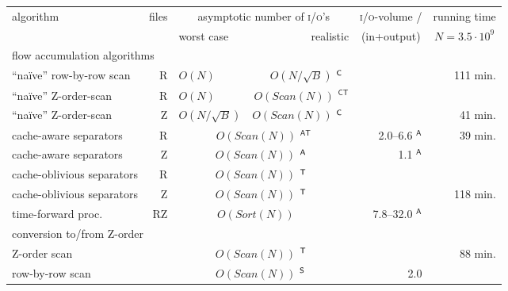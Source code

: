 \documentclass[10pt,a4paper]{article}
\def\io{\textsc{i/o}\xspace}
\def\ios{\textsc{i/o}'s\xspace}
\def\sort{\mathit{Sort}}
\def\scan{\mathit{Scan}}
\begin{document}
\begin{table}
\def\arraystretch{1.25}
\begin{tabularx}{\hsize}{|Xr|lr|r|r|}
\hline
algorithm & files & \multicolumn{2}{c|}{asymptotic number of \ios} & \multicolumn{1}{c|}{\io-volume /} & running time\\
          & & worst case & realistic & \multicolumn{1}{c|}{(in+output)} & \multicolumn{1}{c|}{$N = 3.5 \cdot 10^9$}\\
\hline\hline
\multicolumn{6}{|l|}{flow accumulation algorithms}\\
\hline
``na\"ive'' row-by-row scan & \textsf{R}                  & $O(N)$                           & $O(N/\sqrt B)${ $^{\textsf{C\hphantom{T}}}$} &         & 111 min.\hphantom{*}\\
``na\"ive'' Z-order-scan & \textsf{R}     &$O(N)$                           & $O(\scan(N))${ $^{\textsf{CT}}$} &         &     \\
``na\"ive'' Z-order-scan & \textsf{Z}        & $O(N/\sqrt B)$                   & $O(\scan(N))${ $^{\textsf{C\hphantom{T}}}$} &         &  41 min.\hphantom{*}\\
cache-aware separators & \textsf{R}                   & \multicolumn{2}{c|}{$O(\scan(N))${ $^{\textsf{AT}}$}} & 2.0--6.6{ $^{\textsf{A}}$} &  39 min.\hphantom{*}\\
cache-aware separators & \textsf{Z}   & \multicolumn{2}{c|}{$O(\scan(N))${ $^{\textsf{A\hphantom{T}}}$}} &     1.1{ $^{\textsf{A}}$}  & \\
cache-oblivious separators & \textsf{R}              & \multicolumn{2}{c|}{$O(\scan(N))${ $^{\textsf{T\hphantom{A}}}$}}  & & \\
cache-oblivious separators & \textsf{Z}              & \multicolumn{2}{c|}{$O(\scan(N))${ $^{\textsf{T\hphantom{A}}}$}}  & & 118 min.\hphantom{*}\\
\hline
time-forward proc.~\cite{terraflow,gridproblems,terrastream} & \textsf{RZ} & \multicolumn{2}{c|}{$O(\sort(N))${ $^{\textsf{\hphantom{TA}}}$}}                    &   7.8--32.0{ $^{\textsf{A}}$} & \\
\hline\hline
\multicolumn{6}{|l|}{conversion to/from Z-order}\\
\hline
\multicolumn{2}{|l|}{Z-order scan} & \multicolumn{2}{c|}{$O(\scan(N))${ $^{\textsf{T\hphantom{A}}}$}} &  & 88 min.\hphantom{*}\\
\multicolumn{2}{|l|}{row-by-row scan} & \multicolumn{2}{c|}{$O(\scan(N))${ $^{\textsf{\rlap{S}\hphantom{TA}}}$}} & 2.0\hphantom{ $^{\textsf{A}}$} & \\

\end{tabularx}
\end{table}
\end{document}
